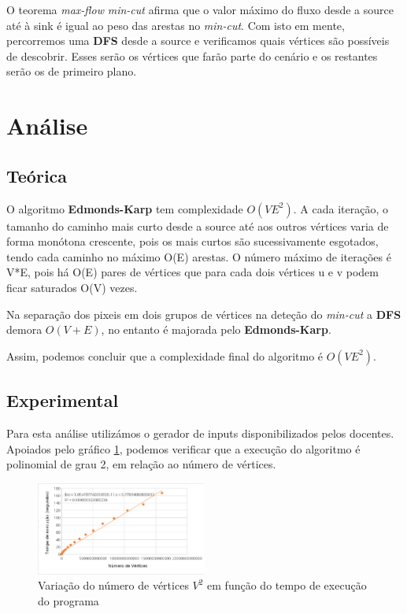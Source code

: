 \documentclass[12pt,a4paper]{article}
\begin{document}
O teorema \textit{max-flow} \textit{min-cut} afirma que o valor máximo do fluxo desde a source até à sink é igual ao peso das arestas no
\textit{min-cut}. Com isto em mente, percorremos uma \textbf{DFS} desde a source e verificamos quais vértices são possíveis de descobrir.
Esses serão os vértices que farão parte do cenário e os restantes serão os de primeiro plano.

\section{Análise}
\subsection{Teórica}
O algoritmo \textbf{Edmonds-Karp} tem complexidade $O(V{E}^2)$. A cada iteração, o tamanho do caminho mais curto desde a source até
aos outros vértices varia de forma monótona crescente, pois os mais curtos são sucessivamente esgotados, tendo cada
caminho no máximo O(E) arestas. O número máximo de iterações é V*E, pois há O(E) pares de vértices que para cada dois
vértices u e v podem ficar saturados O(V) vezes.

Na separação dos pixeis em dois grupos de vértices na deteção do \textit{min-cut} a \textbf{DFS} demora $O(V+E)$, no entanto é majorada
pelo \textbf{Edmonds-Karp}.

Assim, podemos concluir que a complexidade final do algoritmo é $O(V{E}^2)$.

\subsection{Experimental}
Para esta análise utilizámos o gerador de inputs disponibilizados pelos docentes.
Apoiados pelo gráfico \ref{g1}, podemos verificar que a execução do algoritmo é polinomial de grau 2, em relação ao número de vértices.

\begin{figure}[h]
	\centering
	\includegraphics[width=0.5\textwidth]{graph}
	\caption{Variação do número de vértices ${V}^2$ em função do tempo de execução do programa}
	\label{g1}
\end{figure}
\end{document}
